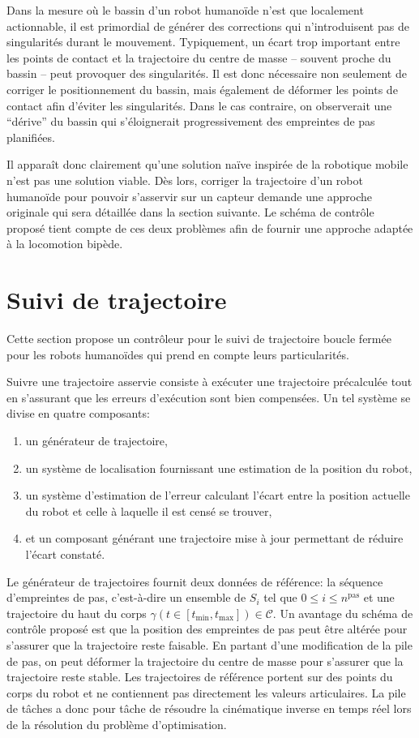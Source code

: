 Dans la mesure où le bassin d'un robot humanoïde n'est que localement
actionnable, il est primordial de générer des corrections qui
n'introduisent pas de singularités durant le mouvement. Typiquement,
un écart trop important entre les points de contact et la trajectoire
du centre de masse -- souvent proche du bassin -- peut provoquer des
singularités. Il est donc nécessaire non seulement de corriger le
positionnement du bassin, mais également de déformer les points de
contact afin d'éviter les singularités. Dans le cas contraire, on
observerait une ``dérive'' du bassin qui s'éloignerait progressivement
des empreintes de pas planifiées.

Il apparaît donc clairement qu'une solution naïve inspirée de la
robotique mobile n'est pas une solution viable. Dès lors, corriger la
trajectoire d'un robot humanoïde pour pouvoir s'asservir sur un
capteur demande une approche originale qui sera détaillée dans la
section suivante. Le schéma de contrôle proposé tient compte de ces
deux problèmes afin de fournir une approche adaptée à la locomotion
bipède.

\section{Suivi de trajectoire}\label{closedloop}


Cette section propose un contrôleur pour le suivi de trajectoire
boucle fermée pour les robots humanoïdes qui prend en compte leurs
particularités.

Suivre une trajectoire asservie consiste à exécuter une trajectoire
précalculée tout en s'assurant que les erreurs d'exécution sont bien
compensées. Un tel système se divise en quatre composants:

\begin{enumerate}
\item un générateur de trajectoire,
\item un système de localisation fournissant une estimation de la position du robot,
\item un système d'estimation de l'erreur calculant l'écart entre la
  position actuelle du robot et celle à laquelle il est censé se
  trouver,
\item et un composant générant une trajectoire mise à jour permettant
  de réduire l'écart constaté.
\end{enumerate}


Le générateur de trajectoires fournit deux données de référence: la
séquence d'empreintes de pas, c'est-à-dire un ensemble de $S_i$ tel
que \mbox{$0 \leq i \leq n^{\text{pas}}$} et une trajectoire du haut
du corps \mbox{$\gamma(t \in [t_{\text{min}}, t_{\text{max}}]) \in
  \mathcal{C}$}. Un avantage du schéma de contrôle proposé est que la
position des empreintes de pas peut être altérée pour s'assurer que la
trajectoire reste faisable. En partant d'une modification de la pile
de pas, on peut déformer la trajectoire du centre de masse pour
s'assurer que la trajectoire reste stable. Les trajectoires de
référence portent sur des points du corps du robot et ne contiennent
pas directement les valeurs articulaires. La pile de tâches a donc pour
tâche de résoudre la cinématique inverse en temps réel lors de la
résolution du problème d'optimisation.

